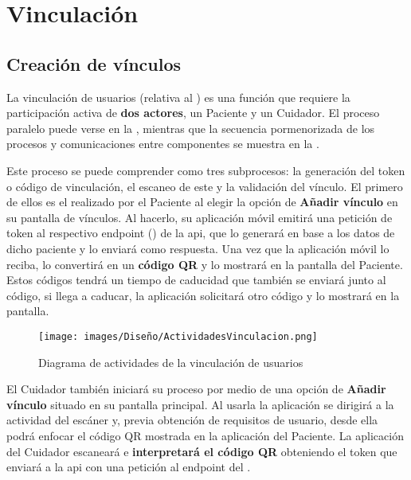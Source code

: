 \section{Vinculación}

\subsection{Creación de vínculos}

La vinculación de usuarios (relativa al 
) es una función que requiere la participación activa de \textbf{dos actores}, un Paciente y un Cuidador. El proceso paralelo puede verse en la , mientras que la secuencia pormenorizada de los procesos y comunicaciones entre componentes se muestra en la .

Este proceso se puede comprender como tres subprocesos: la generación del \gls{token} o código de vinculación, el escaneo de este y la validación del vínculo. El primero de ellos es el realizado por el Paciente al elegir la opción de \textbf{Añadir vínculo} en su pantalla de vínculos. Al hacerlo, su aplicación móvil emitirá una petición de \gls{token} al respectivo \gls{endpoint} () de la \acrshort{api}, que lo generará en base a los datos de dicho paciente y lo enviará como respuesta. Una vez que la aplicación móvil lo reciba, lo convertirá en un \textbf{código QR} y lo mostrará en la pantalla del Paciente. Estos códigos tendrá un tiempo de caducidad que también se enviará junto al código, si llega a caducar, la aplicación solicitará otro código y lo mostrará en la pantalla.

\begin{figure}[H]
    \centering
    \texttt{[image: images/Diseño/ActividadesVinculacion.png]}
    \caption{Diagrama de actividades de la vinculación de usuarios}
    \label{dia:actividad_vinculacion}
\end{figure}

El Cuidador también iniciará su proceso por medio de una opción de \textbf{Añadir vínculo} situado en su pantalla principal. Al usarla la aplicación se dirigirá a la actividad del escáner y, previa obtención de requisitos de usuario, desde ella podrá enfocar el código QR mostrada en la aplicación del Paciente. La aplicación del Cuidador escaneará e \textbf{interpretará el código QR} obteniendo el \gls{token} que enviará a la \acrshort{api} con una petición al \gls{endpoint} del .

